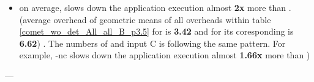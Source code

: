 {\begin{itemize}
\begin{itemize}
\item \textsf{on average, \parlotnc slows down the application execution almost \textbf{2x} more than \parlota. (average overhead of geometric means of all overheads within table  \ref{comet_wo_det_All_all_B_p3.5} for \parlota is \textbf{3.42} and for its coresponding \parlotnc is \textbf{6.62}) . The numbers of \parlotm and input C is following the same pattern. For example, \parlot-nc slows down the application execution almost \textbf{1.66x} more than \parlotm)}
\end{itemize}
\end{itemize}

\vspace{1ex}

\vspace{1ex}
\vspace{1ex}
---}



